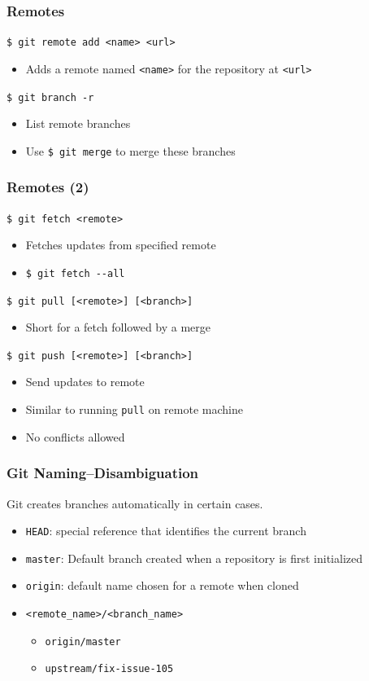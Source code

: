 \documentclass[english,compress]{beamer}
\begin{document}
\begin{frame}[fragile]
    \frametitle{Remotes}

    \verb|$ git remote add <name> <url>|
    \begin{itemize}
        \item Adds a remote named \verb|<name>| for the repository at \verb|<url>|
    \end{itemize}

    \verb|$ git branch -r |
    \begin{itemize}
        \item List remote branches
        \item Use \verb|$ git merge| to merge these branches
    \end{itemize}
\end{frame}

\begin{frame}[fragile]
    \frametitle{Remotes (2)}

    \verb|$ git fetch <remote>|
    \begin{itemize}
        \item Fetches updates from specified remote
        \item \verb|$ git fetch --all|
    \end{itemize}

    \verb|$ git pull [<remote>] [<branch>]|
    \begin{itemize}
        \item Short for a fetch followed by a merge
    \end{itemize}

    \verb|$ git push [<remote>] [<branch>]|
    \begin{itemize}
        \item Send updates to remote
        \item Similar to running \verb|pull| on remote machine
        \item No conflicts allowed
    \end{itemize}
\end{frame}

\begin{frame}[fragile]
    \frametitle{Git Naming--Disambiguation}
    Git creates branches automatically in certain cases.
    \begin{itemize}
        \item \verb|HEAD|: special reference that identifies the current branch
        \item \verb|master|: Default branch created when a repository is first 
            initialized
        \item \verb|origin|: default name chosen for a remote when cloned
        \item \verb|<remote_name>/<branch_name>|
            \begin{itemize}
                \item \verb|origin/master|
                \item \verb|upstream/fix-issue-105|
            \end{itemize}
    \end{itemize}
\end{frame}
\end{document}
